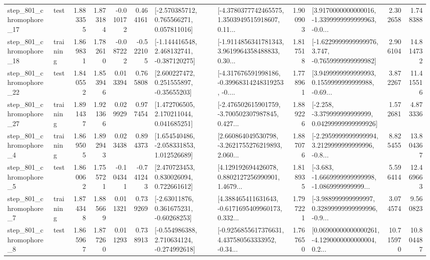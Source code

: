 \begin{tabular}{llrrrrllrlrr}
  step\_801\_chromophore\_17 &      test &      1.883355 &    1.873184 &     -0.010172 &  0.464161 &    [-2.570385712, 0.765566271, 0.057811016] &  [-4.3780377742465575, 1.3503949515918607, 0.11... &       1.900903 &  [3.9170000000000016, -1.3399999999999963, -0.0... &            2.302658 &          1.748388 \\
  step\_801\_chromophore\_18 &  training &      1.869831 &    1.782610 &     -0.087222 & -0.522105 &   [-1.144416548, 2.468132741, -0.387120275] &  [-1.9114856341781343, 3.9619964358488833, 0.30... &       1.817518 &  [-1.6229999999999976, 3.747, -0.7659999999999982] &            2.906104 &         14.814732 \\
  step\_801\_chromophore\_22 &      test &      1.840552 &    1.853946 &      0.013394 &  0.765808 &     [2.600227472, 0.251555897, -0.35655203] &  [-4.317676591998186, -0.39968314248319253, -0.... &       1.778961 &  [3.9499999999999993, 0.1559999999999988, -0.69... &            3.872267 &         11.415516 \\
  step\_801\_chromophore\_27 &  training &      1.891437 &    1.921366 &      0.029929 &  0.977454 &     [1.472706505, 2.170211044, 0.041685251] &  [-2.476502615901759, -3.700502307987845, 0.427... &       1.889226 &  [-2.258, -3.379999999999999, 0.04299999999999926] &            1.572681 &          4.873336 \\
   step\_801\_chromophore\_4 &  training &      1.869505 &    1.892943 &      0.023438 &  0.894373 &    [1.654540486, -2.058331853, 1.012526689] &  [2.660864049530798, -3.2621755276219893, 2.060... &       1.887076 &  [-2.2959999999999994, 3.2129999999999996, -0.8... &            8.825455 &         13.804367 \\
   step\_801\_chromophore\_5 &      test &      1.860062 &    1.755721 &     -0.104341 & -0.741243 &     [2.470723453, 0.830026094, 0.722661612] &  [4.129192694426078, 0.8802127256990901, 1.4679... &       1.818935 &  [-3.683, -1.6669999999999998, -1.0869999999999... &            5.596414 &         12.469663 \\
   step\_801\_chromophore\_7 &  training &      1.874348 &    1.885669 &      0.011321 &  0.739269 &     [-2.63011876, 0.361675231, -0.60268253] &  [4.388465411631643, -0.6171695409960173, 0.332... &       1.797221 &  [-3.988999999999997, 0.32899999999999996, -0.9... &            3.074574 &          9.560823 \\
   step\_801\_chromophore\_8 &      test &      1.865967 &    1.877260 &      0.011293 &  0.738913 &   [-0.554986388, 2.710634124, -0.274992618] &  [-0.9256855617376631, 4.437580563333952, -0.34... &       1.767650 &  [0.06900000000000261, -4.1290000000000004, 0.2... &           10.715970 &         10.804487 \\

\end{tabular}
